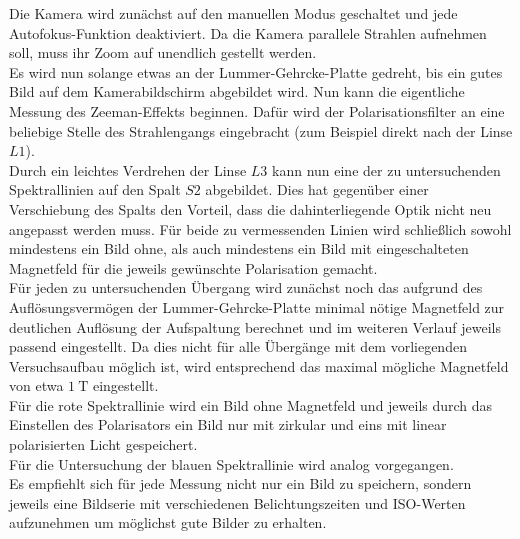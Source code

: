 Die Kamera wird zunächst auf den manuellen Modus geschaltet und jede Autofokus-Funktion deaktiviert.
Da die Kamera parallele Strahlen aufnehmen soll, muss ihr Zoom auf unendlich gestellt werden.\\
Es wird nun solange etwas an der Lummer-Gehrcke-Platte gedreht, bis ein gutes Bild auf dem Kamerabildschirm abgebildet wird.
Nun kann die eigentliche Messung des Zeeman-Effekts beginnen. Dafür wird der Polarisationsfilter an eine beliebige Stelle des Strahlengangs eingebracht (zum Beispiel direkt nach der Linse $L1$).\\
Durch ein leichtes Verdrehen der Linse $L3$ kann nun eine der zu untersuchenden Spektrallinien auf den Spalt $S2$ abgebildet. Dies hat gegenüber einer Verschiebung des Spalts den Vorteil, dass die dahinterliegende Optik nicht neu angepasst werden muss.
Für beide zu vermessenden Linien wird schließlich sowohl mindestens ein Bild ohne, als auch mindestens ein Bild mit eingeschalteten Magnetfeld für die jeweils gewünschte Polarisation gemacht.\\
Für jeden zu untersuchenden Übergang wird zunächst noch das aufgrund des Auflösungsvermögen der Lummer-Gehrcke-Platte minimal nötige Magnetfeld zur deutlichen Auflösung der Aufspaltung berechnet und im weiteren Verlauf jeweils passend eingestellt.
Da dies nicht für alle Übergänge mit dem vorliegenden Versuchsaufbau möglich ist, wird entsprechend das maximal mögliche Magnetfeld von etwa $\SI{1}{\tesla}$ eingestellt.\\
Für die rote Spektrallinie wird ein Bild ohne Magnetfeld und jeweils durch das Einstellen des Polarisators ein Bild nur mit zirkular und eins mit linear polarisierten Licht gespeichert.\\
Für die Untersuchung der blauen Spektrallinie wird analog vorgegangen.\\
Es empfiehlt sich für jede Messung nicht nur ein Bild zu speichern, sondern jeweils eine Bildserie mit verschiedenen Belichtungszeiten und ISO-Werten aufzunehmen um möglichst gute Bilder zu erhalten.
